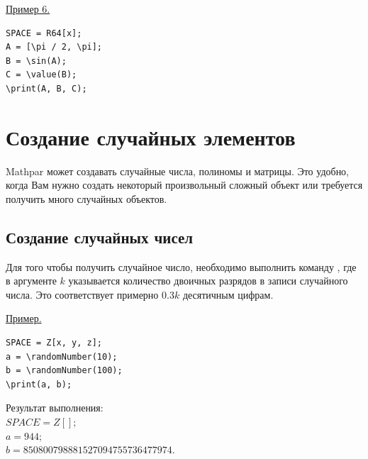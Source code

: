 \underline{Пример 6. }
\begin{verbatim}
SPACE = R64[x];
A = [\pi / 2, \pi];
B = \sin(A);
C = \value(B);
\print(A, B, C);
\end{verbatim}


\section{Создание случайных элементов }
Mathpar может создавать случайные числа,  полиномы и матрицы.
Это удобно, когда Вам нужно создать некоторый произвольный сложный объект или требуется получить много случайных объектов.
\subsection{Создание случайных чисел}

Для того чтобы получить случайное число,  необходимо выполнить команду 
, где в аргументе $k$ указывается количество 
двоичных разрядов в записи случайного числа. 
Это соответствует примерно $0.3 k$ десятичным цифрам.  

\smallskip

\underline{Пример. }

\vspace*{-3mm}

\begin{verbatim}
SPACE = Z[x, y, z];
a = \randomNumber(10);
b = \randomNumber(100);
\print(a, b);
\end{verbatim}

Результат выполнения:\\ 
$SPACE=Z[]; $ \\
$a = 944; $ \\
$b = 850800798881527094755736477974. $

